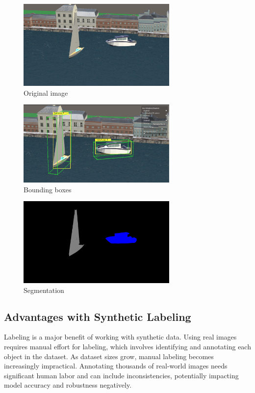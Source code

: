 \begin{figure}[H]
    \centering
    \includegraphics[width=0.7\textwidth]{Figures/rgb_2.png}
    \caption{Original image}
    \label{fig:image1}
\end{figure}

\begin{figure}[H]
    \centering
    \includegraphics[width=0.7\textwidth]{Figures/boundingbox.png}
    \caption{Bounding boxes}
    \label{fig:image2}
\end{figure}

\begin{figure}[H]
    \centering
    \includegraphics[width=0.7\textwidth]{Figures/segmentation_2.png}
    \caption{Segmentation}
    \label{fig:image3}
\end{figure}




\subsection{Advantages with Synthetic Labeling}
Labeling is a major benefit of working with synthetic data. Using real images requires manual effort for labeling, which involves identifying and annotating each object in the dataset. As dataset sizes grow, manual labeling becomes increasingly impractical. Annotating thousands of real-world images needs significant human labor and can include inconsistencies, potentially impacting model accuracy and robustness negatively. \cite{nikolenko2021synthetic}\\

